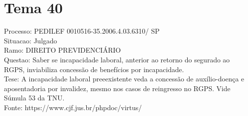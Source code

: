 \documentclass[12pt]{article}
\begin{document}
\section*{Tema 40}
Processo: PEDILEF 0010516-35.2006.4.03.6310/ SP\\
Situacao: Julgado\\
Ramo: DIREITO PREVIDENCIÁRIO\\
Questao: Saber se incapacidade laboral, anterior ao retorno do segurado ao RGPS, inviabiliza concessão de benefícios por incapacidade.\\
Tese: A incapacidade laboral preeexistente veda a concessão de auxílio-doença e aposentadoria por invalidez, mesmo nos casos de reingresso no RGPS. Vide Súmula 53 da TNU.\\
Fonte: https://www.cjf.jus.br/phpdoc/virtus/
\end{document}
